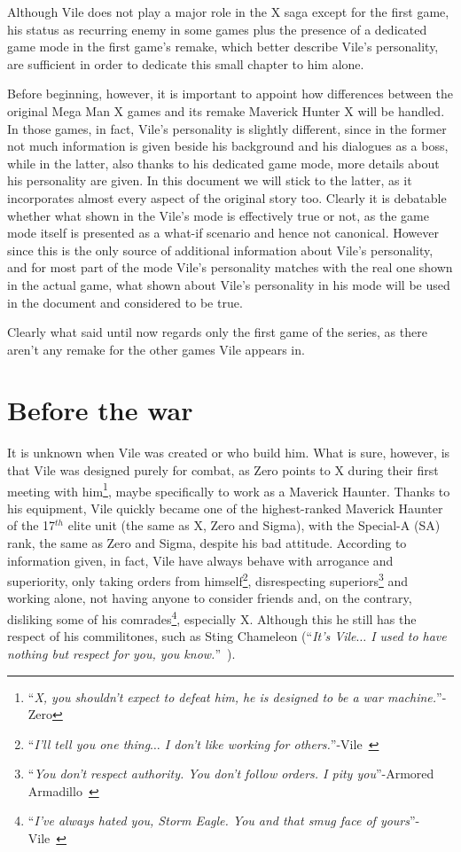 Although Vile does not play a major role in the X saga except for the first game, his status as recurring enemy in some games plus the presence of a dedicated game mode in the first game's remake, which better describe Vile's personality, are sufficient in order to dedicate this small chapter to him alone. 

Before beginning, however, it is important to appoint how differences between the original Mega Man X games and its remake Maverick Hunter X will be handled. In those games, in fact, Vile's personality is slightly different, since in the former not much information is given beside his background and his dialogues as a boss, while in the latter, also thanks to his dedicated game mode, more details about his personality are given. In this document we will stick to the latter, as it incorporates almost every aspect of the original story too. Clearly it is debatable whether what shown in the Vile's mode is effectively true or not, as the game mode itself is presented as a what-if scenario and hence not canonical. However since this is the only source of additional information about Vile's personality, and for most part of the mode Vile's personality matches with the real one shown in the actual game, what shown about Vile's personality in his mode will be used in the document and considered to be true.

Clearly what said until now regards only the first game of the series, as there aren't any remake for the other games Vile appears in.

\section{Before the war}
It is unknown when Vile was created or who build him. What is sure, however, is that Vile was designed purely for combat, as Zero points to X during their first meeting with him\footnote{``\textit{X, you shouldn't expect to defeat him, he is designed to be a war machine.}''- Zero}, maybe specifically to work as a Maverick Haunter. Thanks to his equipment, Vile quickly became one of the highest-ranked Maverick Haunter of the 17$^{th}$ elite unit (the same as X, Zero and Sigma), with the Special-A (SA) rank, the same as Zero and Sigma, despite his bad attitude. According to information given, in fact, Vile have always behave with arrogance and superiority, only taking orders from himself\footnote{``\textit{I'll tell you one thing$\dots$ I don't like working for others.}''-Vile~\cite{MHX:Vile_script}}, disrespecting superiors\footnote{``\textit{You don't respect authority. You don't follow orders. I pity you}''-Armored Armadillo~\cite{MHX:Vile_script}} and working alone, not having anyone to consider friends and, on the contrary, disliking some of his comrades\footnote{``\textit{I've always hated you, Storm Eagle. You and that smug face of yours}''-Vile~\cite{MHX:Vile_script}}, especially X. Although this he still has the respect of his commilitones, such as Sting Chameleon (``\textit{It's Vile$\dots$ I used to have nothing but respect for you, you know.}''~\cite{MHX:Vile_script}).

